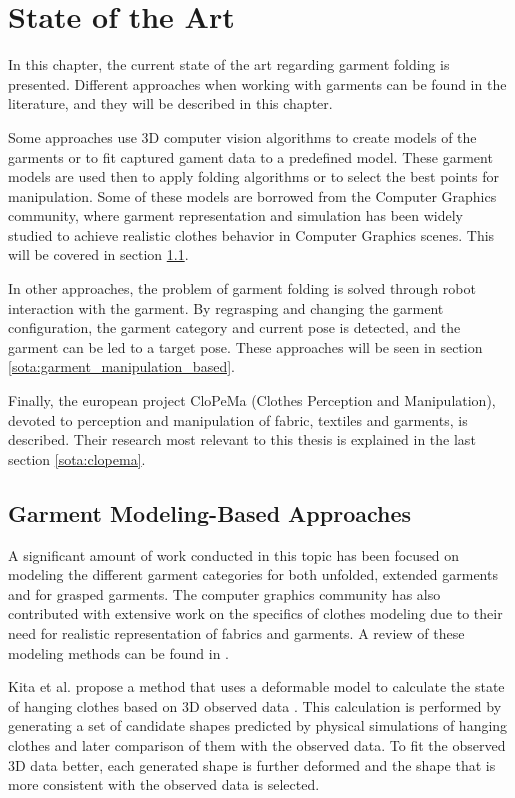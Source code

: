 \chapter{State of the Art}
\label{state_of_the_art}

In this chapter, the current state of the art regarding garment folding is presented. Different approaches when working with garments can be found in the literature, and they will be described in this chapter.

Some approaches use 3D computer vision algorithms to create models of the garments or to fit captured gament data to a predefined model. These garment models are used then to apply folding algorithms or to select the best points for manipulation. Some of these models are borrowed from the Computer Graphics community, where garment representation and simulation has been widely studied to achieve realistic clothes behavior in Computer Graphics scenes. This will be covered in section \ref{sota:garment_model_based}.

In other approaches, the problem of garment folding is solved through robot interaction with the garment. By regrasping and changing the garment configuration, the garment category and current pose is detected, and the garment can be led to a target pose. These approaches will be seen in section \ref{sota:garment_manipulation_based}.

Finally, the european project CloPeMa (Clothes Perception and Manipulation), devoted to perception and manipulation of fabric, textiles and garments, is described. Their research most relevant to this thesis is explained in the last section \ref{sota:clopema}.

\section{Garment Modeling-Based Approaches}
\label{sota:garment_model_based}
A significant amount of work conducted in this topic has been focused on modeling the different garment categories for both unfolded, extended garments and for grasped garments. The computer graphics community has also contributed with extensive work on the specifics of clothes modeling due to their need for realistic representation of fabrics and garments. A review of these modeling methods can be found in \cite{Chen2009}. 

Kita et al. propose a method that uses a deformable model to calculate the state of hanging clothes based on 3D observed data \cite{Kita2004, Kita2009}. This calculation is performed by generating a set of candidate shapes predicted by physical simulations of hanging clothes and later comparison of them with the observed data. To fit the observed 3D data better, each generated shape is further deformed and the shape that is more consistent with the observed data is selected. 


